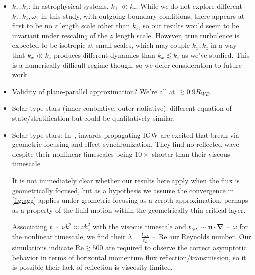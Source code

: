 \documentclass[
        fleqn,
        usenatbib,
    ]{mnras}
\newcommand*{\bm}[1]{\boldsymbol{\mathbf{#1}}}
\begin{document}
\begin{itemize}
    \item $k_x, k_z$: In astrophysical systems, $k_{\perp} \ll k_r$. While we do
        not explore different $k_{x}, k_{z}, \omega_1$ in this study, with
        outgoing boundary conditions, there appears at first to be no $z$ length
        scale other than $k_{z}$, so our results would seem to be invariant
        under rescaling of the $z$ length scale. However, true turbulence is
        expected to be isotropic at small scales, which may couple $k_{x},
        k_{z}$ in a way that $k_{x} \ll k_{z}$ produces different dynamics
        than $k_{x} \lesssim k_{z}$ as we've studied. This is a numerically
        difficult regime though, so we defer consideration to future work.

    \item Validity of plane-parallel approximation? We're all at $\gtrsim
        0.9R_{WD}$.

    \item Solar-type stars (inner conbmtive, outer radiative): different
        equation of state/stratification but could be qualitatively similar.

    \item Solar-type stars: In~\cite{barker_ogilvie}, inwards-propagating IGW
        are excited that break via geometric focusing and effect
        synchronization. They find no reflected wave despite their nonlinear
        timescales being $10\times$ shorter than their viscous timescale.

        It is not immediately clear whether our results here apply when the flux
        is geometrically focused, but as a hypothesis we assume the convergence
        in \autoref{fig:agg} applies under geometric focusing as a zeroth
        approximation, perhaps as a property of the fluid motion within the
        geometrically thin critical layer.

        Associating $t_{} \sim \nu k^2 \approx \nu k_z^2$ with the visocus
        timescale and $t_{NL} \sim \bm{u} \cdot \bm{\nabla} \sim \omega$ for
        the nonlinear timescale, we find their $\lambda = \frac{t_{NL}}{t_L}
        \sim \mathrm{Re}$ our Reynolds number. Our simulations indicate
        $\mathrm{Re} \gtrsim 500$ are required to observe the correct asymptotic
        behavior in terms of horizontal momentum flux reflection/transmission,
        so it is possible their lack of reflection is viscosity limited.
\end{itemize}
\end{document}
